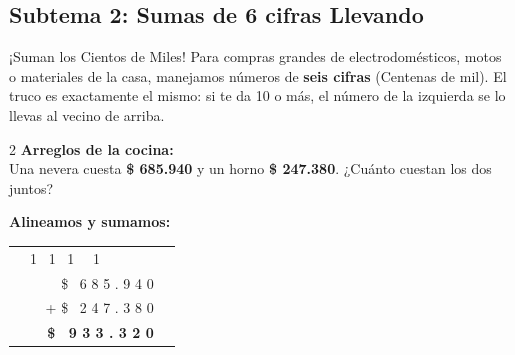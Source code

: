 \documentclass[12pt, letterpaper]{article}
\begin{document}
\vspace{0.5cm}
\noindent\begin{minipage}{\textwidth}
\subsection*{Subtema 2: Sumas de 6 cifras Llevando}

\begin{concepto}{¡Suman los Cientos de Miles!}
Para compras grandes de electrodomésticos, motos o materiales de la casa, manejamos números de \textbf{seis cifras} (Centenas de mil). El truco es exactamente el mismo: si te da 10 o más, el número de la izquierda se lo llevas al vecino de arriba.
\end{concepto}

\begin{ejemplo}
\begin{multicols}{2}
    \textbf{Arreglos de la cocina:}\\
    Una nevera cuesta \textbf{\$ 685.940} y un horno \textbf{\$ 247.380}. ¿Cuánto cuestan los dos juntos?

    \columnbreak

    \textbf{Alineamos y sumamos:}\\
    \begin{tabular}{r@{\quad}l}
      \small \ \ \textcolor{valred}{1} \ \textcolor{valred}{1} \ \textcolor{valred}{1} \ \ \textcolor{valred}{1}  \ \ \ \ \ \ \ & \\[-1ex]
      \$ \ 6 8 5 . 9 4 0 & \\
    + \$ \ 2 4 7 . 3 8 0 & \\
    \hline
      \textbf{\$ \ 9 3 3 . 3 2 0} & 
    \end{tabular}
\end{multicols}
\end{ejemplo}
\end{minipage}
\end{document}
